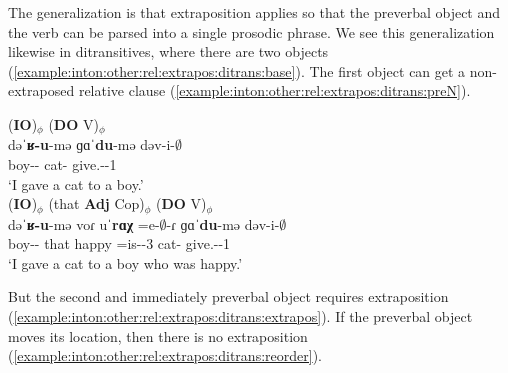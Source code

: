 The generalization is that extraposition applies so that the preverbal object and the verb can be parsed into a single prosodic phrase. We see this generalization likewise in ditransitives, where there are  two objects (\ref{example:inton:other:rel:extrapos:ditrans:base}). The first object can get a non-extraposed relative clause (\ref{example:inton:other:rel:extrapos:ditrans:preN}). 

\begin{exe}
	\ex \begin{xlist}
		\ex \glll (\textbf{IO})$_\phi$ (\textbf{DO} V)$_\phi$ \\
		dəˈ\textbf{ʁ-u}-mə ɡɑˈ\textbf{du}-mə dəv-i-$\emptyset$ \\
		boy-{\dat}-{\indf} cat-{\indf} give.{\aorperf}-{\pst}-1{\sg} \\
		\trans `I gave a cat to a boy.' 
		\label{example:inton:other:rel:extrapos:ditrans:base}
		\\ 
		\ex \glll (\textbf{IO})$_\phi$ (that \textbf{Adj} Cop)$_\phi$ (\textbf{DO} V)$_\phi$ \\
		dəˈ\textbf{ʁ-u}-mə  voɾ u\textbf{ˈrɑχ} =e-$\emptyset$-ɾ ɡɑˈ\textbf{du}-mə dəv-i-$\emptyset$ \\
		boy-{\dat}-{\indf} that happy =is-{\pst}-3{\sg} cat-{\indf} give.{\aorperf}-{\pst}-1{\sg} \\
		\trans `I gave a cat to a boy who was happy.' 
		\label{example:inton:other:rel:extrapos:ditrans:preN}
		\\ 
	\end{xlist}
\end{exe}



But the second and immediately preverbal object requires extraposition (\ref{example:inton:other:rel:extrapos:ditrans:extrapos}). If the preverbal object moves its location, then there is no extraposition (\ref{example:inton:other:rel:extrapos:ditrans:reorder}).  

